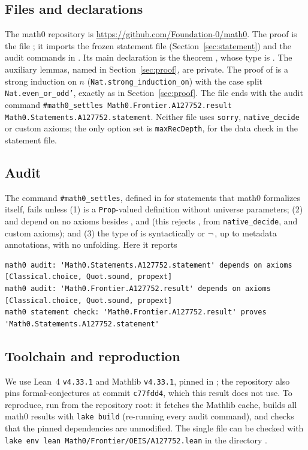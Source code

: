 \documentclass[11pt]{amsart}
\theoremstyle{plain}
\theoremstyle{definition}
\begin{document}
\subsection*{Files and declarations}
The math0 repository is \url{https://github.com/Foundation-0/math0}. The proof is the file ; it imports the frozen statement file  (Section~\ref{sec:statement}) and the audit commands in . Its main declaration is the theorem , whose type is . The auxiliary lemmas, named in Section~\ref{sec:proof}, are private. The proof of  is a strong induction on $n$ (\texttt{Nat.strong\_induction\_on}) with the case split \texttt{Nat.even\_or\_odd'}, exactly as in Section~\ref{sec:proof}. The file ends with the audit command \texttt{\#math0\_settles Math0.Frontier.A127752.result Math0.Statements.A127752.statement}. Neither file uses \texttt{sorry}, \texttt{native\_decide} or custom axioms; the only option set is \texttt{maxRecDepth}, for the data check  in the statement file.

\subsection*{Audit}
The command \texttt{\#math0\_settles}, defined in  for statements that math0 formalizes itself, fails unless (1)  is a \texttt{Prop}-valued definition without universe parameters; (2)  and  depend on no axioms besides ,  and  (this rejects ,  from \texttt{native\_decide}, and custom axioms); and (3) the type of  is syntactically  or $\neg$\,, up to metadata annotations, with no unfolding. Here it reports
\begin{lstlisting}[basicstyle=\ttfamily\scriptsize]
math0 audit: 'Math0.Statements.A127752.statement' depends on axioms [Classical.choice, Quot.sound, propext]
math0 audit: 'Math0.Frontier.A127752.result' depends on axioms [Classical.choice, Quot.sound, propext]
math0 statement check: 'Math0.Frontier.A127752.result' proves 'Math0.Statements.A127752.statement'
\end{lstlisting}

\subsection*{Toolchain and reproduction}
We use Lean~4 \cite{Lean4} \texttt{v4.33.1} and Mathlib \cite{Mathlib} \texttt{v4.33.1}, pinned in ; the repository also pins formal-conjectures \cite{FC} at commit \texttt{c77fdd4}, which this result does not use.
To reproduce, run  from the repository root: it fetches the Mathlib cache, builds all math0 results with \texttt{lake build} (re-running every audit command), and checks that the pinned dependencies are unmodified. The single file can be checked with \texttt{lake env lean Math0/Frontier/OEIS/A127752.lean} in the directory .
\end{document}
